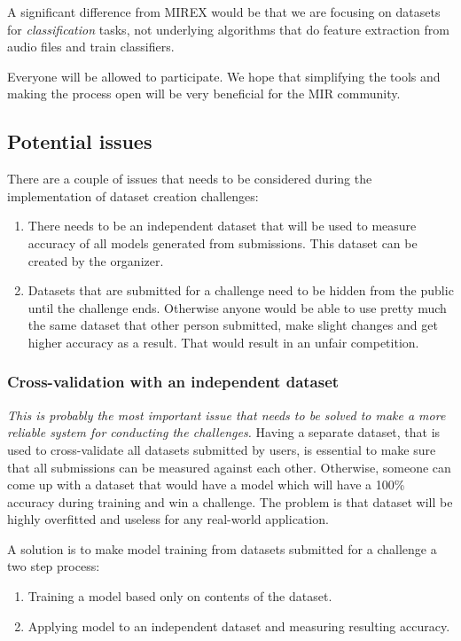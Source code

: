 A significant difference from MIREX would be that we are focusing on datasets for \emph{classification} tasks, not underlying algorithms that do feature extraction from audio files and train classifiers.

Everyone will be allowed to participate. We hope that simplifying the tools and making the process open will be very beneficial for the MIR community.

\subsection{Potential issues}

There are a couple of issues that needs to be considered during the implementation of dataset creation challenges:

\begin{enumerate}
    \item There needs to be an independent dataset that will be used to measure accuracy of all models generated from submissions. This dataset can be created by the organizer.
    \item Datasets that are submitted for a challenge need to be hidden from the public until the challenge ends. Otherwise anyone would be able to use pretty much the same dataset that other person submitted, make slight changes and get higher accuracy as a result. That would result in an unfair competition.
\end{enumerate}

\subsubsection{Cross-validation with an independent dataset}

\emph{This is probably the most important issue that needs to be solved to make a more reliable system for conducting the challenges.} Having a separate dataset, that is used to cross-validate all datasets submitted by users, is essential to make sure that all submissions can be measured against each other. Otherwise, someone can come up with a dataset that would have a model which will have a 100\% accuracy during training and win a challenge. The problem is that dataset will be highly overfitted and useless for any real-world application.

A solution is to make model training from datasets submitted for a challenge a two step process:
\begin{enumerate}
    \item Training a model based only on contents of the dataset.
    \item Applying model to an independent dataset and measuring resulting accuracy.
\end{enumerate}

